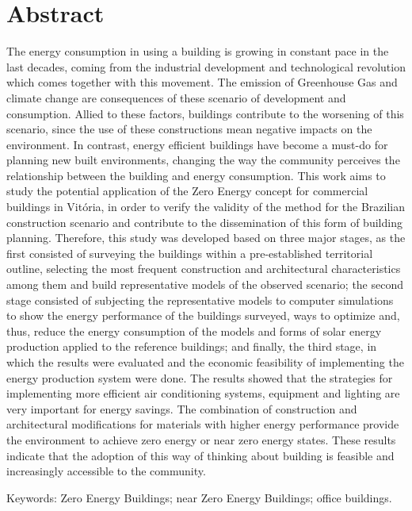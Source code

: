 \section*{Abstract}
\vspace*{1.5cm} %
\thispagestyle{empty}
    \begin{onehalfspace}
        The  energy consumption in using a building is growing in constant
        pace  in  the  last  decades, coming from the industrial development and 
        technological revolution which comes together with this movement. 
        The emission of Greenhouse Gas and climate change are consequences of these 
        scenario  of  development  and  consumption.  Allied  to  these  factors,  
        buildings  contribute  to  the worsening of this scenario, since the use of 
        these  constructions mean negative  impacts on  the environment.  In  contrast,  
        energy  efficient  buildings  have  become  a  must-do  for  planning  
        new built  environments,  changing  the  way  the  community  perceives  
        the  relationship  between  the building and energy consumption. This work 
        aims to study the potential application of the Zero Energy concept for commercial 
        buildings in Vitória, in order to verify the validity of the method for the 
        Brazilian construction scenario and contribute to the dissemination of this 
        form of building planning. Therefore, this study was developed based on three 
        major stages, as the first consisted of surveying the buildings within a 
        pre-established territorial outline, selecting the most frequent construction  
        and  architectural  characteristics  among  them  and  build  representative  
        models  of the  observed  scenario;  the  second  stage  consisted  of  subjecting  
        the  representative  models  to computer  simulations  to  show  the  energy  
        performance  of  the  buildings  surveyed,  ways  to optimize  and,  
        thus,  reduce  the  energy  consumption  of  the  models  and  forms  of  solar  
        energy production  applied  to  the  reference  buildings;  and  finally,  
        the  third  stage,  in  which  the  results were evaluated and the economic 
        feasibility of implementing the energy production system were done.  
        The  results  showed  that  the  strategies  for  implementing  more  efficient  
        air  conditioning systems,  equipment  and  lighting  are  very  important  
        for  energy  savings.  The  combination  of construction  and  architectural  
        modifications  for  materials  with  higher  energy  performance provide the 
        environment to achieve zero energy or near zero energy states. 
        These results indicate that the adoption of this way of thinking about building 
        is feasible and increasingly accessible to the community.\newline
    
        \noindent Keywords: Zero Energy Buildings; near Zero Energy Buildings; office buildings.
        \pagebreak
    \end{onehalfspace}